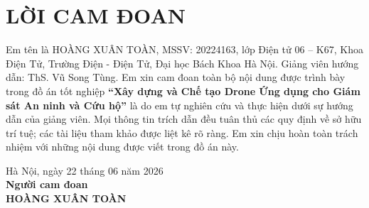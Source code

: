 \section*{LỜI CAM ĐOAN}
\thispagestyle{empty}
Em tên là HOÀNG XUÂN TOÀN, MSSV: 20224163, lớp Điện tử 06 -- K67, Khoa Điện Tử, Trường Điện - Điện Tử, Đại học Bách Khoa Hà Nội. Giảng viên hướng dẫn: ThS. Vũ Song Tùng. Em xin cam đoan toàn bộ nội dung được trình bày trong đồ án tốt nghiệp \textbf{``Xây dựng và Chế tạo Drone Ứng dụng cho Giám sát An ninh và Cứu hộ''} là do em tự nghiên cứu và thực hiện dưới sự hướng dẫn của giảng viên. Mọi thông tin trích dẫn đều tuân thủ các quy định về sở hữu trí tuệ; các tài liệu tham khảo được liệt kê rõ ràng. Em xin chịu hoàn toàn trách nhiệm với những nội dung được viết trong đồ án này.

\vspace{1cm}
\hfill
\begin{minipage}{0.5\textwidth}
    \centering
    Hà Nội, ngày 22 tháng 06 năm 2026 \\
    \vspace{0.2cm}
    \textbf{Người cam đoan} \\
    \vspace{2cm}
    \textbf{HOÀNG XUÂN TOÀN}
\end{minipage}
\cleardoublepage

